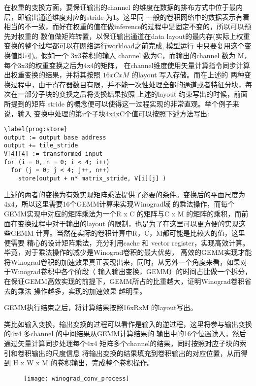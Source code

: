 在权重的变换方面，要保证输出的channel 的维度在数据的排布方式中位于最内层，即输出通道维度对应的stride 为1。这里同
一般的卷积网络中的数据表示有着相当的不一致，而好在权重的值在做inference的过程中是固定不变的，所以可以预先对权重的
数值做矩阵转置，以保证输出通道在data layout的最内存(实际上权重变换的整个过程都可以在网络运行workload之前完成, 模型运行
中只要复用这个变换值即可)。假如一个 3x3卷积的输入 channel 数为C，而输出的channel 数为 M，每个3x3的权重变换之后为4x4的矩阵，
在channel维度使用矢量计算指令同步计算出权重变换的结果，并将其按照 $ 16 x C x M $ 的layout 写入存储。而在上述的
两种变换过程中，由于寄存器数目有限，并不能一次性处理全部的通道或者特征分块，每次在一部分子块的变换之后将变换结果按照
上述的layout 约束写出的时候，前面所提到的矩阵 stride 的概念便可以使得这一过程实现的非常直观。举个例子来说，输入
变换中处理的第r个子块4x4xC个值可以按照下述方法写出:

\begin{lstlisting}
\label{prog:store}
output := output base address
output += tile_stride
V[4][4] := transformed input
for (i = 0, n = 0; i < 4; i++)
  for (j = 0; j < 4; j++, n++)
    store(output + n* matrix_stride, V[i][j] )
\end{lstlisting}

上述的两者的变换为有效实现矩阵乘法提供了必要的条件。变换后的平面尺度为4x4，所以这里需要16个GEMM计算来实现Winograd域
的乘法操作，而每个GEMM实现中对应的矩阵乘法为一个R x C 的矩阵与C x M 的矩阵的乘积，而前面在变换过程中对于输出的layout
的限制，也是为了在这里可以更方便的实现这些GEMM 计算。当然在实际的卷积计算中R，C，M都可能是比较大的值，这里便需要
精心的设计矩阵乘法，充分利用cache 和 vector register，实现高效计算。毕竟，对于乘法操作的减少是Winograd卷积的最大优势，
高效的GEMM实现才能将Winograd卷积的加速效果真正表现出来，同时，从另外一个角度来看，如果对于Winograd卷积中各个阶段（
输入输出变换，GEMM）的时间占比做一个拆分，在保证GEMM高效实现的前提下，GEMM所占的比重越大，证明Winograd卷积省去的乘法
操作越多，实现的加速效果 越明显。

GEMM执行结束之后，将计算结果按照16xRxM 的layout写出。

类比如输入变换，输出变换的过程可以看作是输入的逆过程，这里将参与输出变换的4x4 多channel 的中间结果从GEMM计算结果的
输出中的16个位置读入，然后通过矢量计算同步处理每个4x4 矩阵多个channel的结果，同时按照对应子块的索引和卷积输出的尺度信息
将输出变换的结果填充到卷积输出的对应位置，从而得到 H x W x M 的卷积输出，完成整个卷积操作。

\begin{figure}
\label{fig:winograd_full_procedure}
\texttt{[image: winograd\_conv\_process]}
\end{figure}

